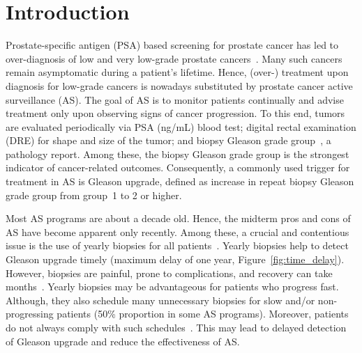 \section{Introduction}
\label{sec:introduction}
Prostate-specific antigen (PSA) based screening for prostate cancer has led to over-diagnosis of low and very low-grade prostate cancers~\citep{crawford2003epidemiology,newcomer1997temporal}. Many such cancers remain asymptomatic during a patient's lifetime. Hence, (over-) treatment upon diagnosis for low-grade cancers is nowadays substituted by prostate cancer active surveillance (AS). The goal of AS is to monitor patients continually and advise treatment only upon observing signs of cancer progression. To this end, tumors are evaluated periodically via PSA (ng/mL) blood test; digital rectal examination (DRE) for shape and size of the tumor; and biopsy Gleason grade group~\citep{epsteinGG2014}, a pathology report. Among these, the biopsy Gleason grade group is the strongest indicator of cancer-related outcomes. Consequently, a commonly used trigger for treatment in AS is Gleason upgrade, defined as increase in repeat biopsy Gleason grade group from group~1 to 2 or higher.

Most AS programs are about a decade old. Hence, the midterm pros and cons of AS have become apparent only recently. Among these, a crucial and contentious issue is the use of yearly biopsies for all patients~\citep{loeb2014heterogeneity}. Yearly biopsies help to detect Gleason upgrade timely (maximum delay of one year, Figure~\ref{fig:time_delay}). However, biopsies are painful, prone to complications, and recovery can take months~\citep{loeb2013systematic}. Yearly biopsies may be advantageous for patients who progress fast. Although, they also schedule many unnecessary biopsies for slow and/or non-progressing patients (50\% proportion in some AS programs). Moreover, patients do not always comply with such schedules~\citep{bokhorst2015compliance}. This may lead to delayed detection of Gleason upgrade and reduce the effectiveness of AS.

